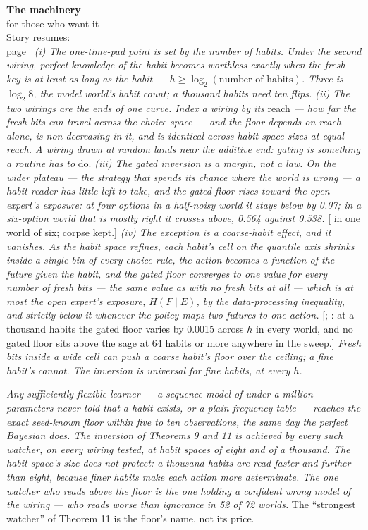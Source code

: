 \begin{machinery}{\textbf{The machinery}\\for those who want it\\[3pt]{\color{muted}Story resumes:\\page~\pageref{partIV}}}
\noindent \emph{(i) The one-time-pad point is set by the number of habits. Under the second
wiring, perfect knowledge of the habit becomes worthless exactly when
the fresh key is at least as long as the habit --- \(h \ge \log_2(\text{number of habits})\). Three is \(\log_2 8\), the model world's habit count; a thousand
habits need ten flips. (ii) The two wirings are the ends of one curve.
Index a wiring by its} reach \emph{--- how far the fresh bits can travel
across the choice space --- and the floor depends on reach alone, is
non-decreasing in it, and is identical across habit-space sizes at
equal reach. A wiring drawn at random lands near the additive end:
gating is something a routine has to} do. \emph{(iii) The gated inversion is
a margin, not a law. On the wider plateau --- the strategy that spends
its chance where the world is wrong --- a habit-reader has little left to
take, and the gated floor rises toward the open expert's exposure: at
four options in a half-noisy world it stays below by 0.07; in a
six-option world that is mostly right it crosses above, 0.564 against
0.538.} {[} in one world of six; corpse kept.{]} \emph{(iv) The exception is a coarse-habit effect, and it vanishes.
As the habit space refines, each habit's cell on the quantile axis
shrinks inside a single bin of every choice rule, the action becomes a
function of the future given the habit, and the gated floor converges
to one value for every number of fresh bits --- the same value as with
no fresh bits at all --- which is at most the open expert's exposure,
\(H(F \mid E)\), by the data-processing inequality, and strictly below it
whenever the policy maps two futures to one action.} {[}; :
at a thousand habits the gated floor varies by 0.0015 across \(h\) in every
world, and no gated floor sits above the sage at 64 habits or more
anywhere in the sweep.{]} \emph{Fresh bits inside a wide cell can push a
coarse habit's floor over the ceiling; a fine habit's cannot. The
inversion is universal for fine habits, at every \(h\).}


\label{claim-16}

\noindent \emph{Any sufficiently flexible
learner --- a sequence model of under a million parameters never told
that a habit exists, or a plain frequency table --- reaches the exact
seed-known floor within five to ten observations, the same day the
perfect Bayesian does. The inversion of Theorems 9 and 11 is achieved
by every such watcher, on every wiring tested, at habit spaces of eight
and of a thousand. The habit space's size does not protect: a thousand
habits are read faster and further than eight, because finer habits
make each action more determinate. The one watcher who reads above the
floor is the one holding a confident wrong model of the wiring --- who
reads worse than ignorance in 52 of 72 worlds.} The ``strongest
watcher'' of Theorem 11 is the floor's name, not its price.


\end{machinery}
